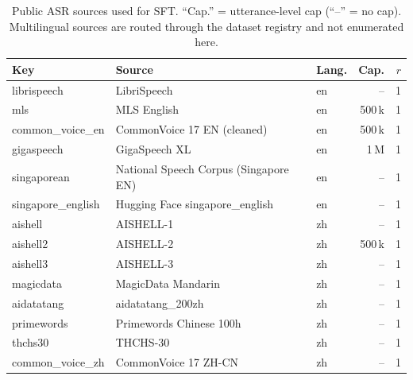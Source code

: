 \begin{table}[t]
  \caption{Public ASR sources used for SFT. ``Cap.'' = utterance-level
    cap (``--'' = no cap). Multilingual sources are routed through the
    dataset registry and not enumerated here.}
  \label{tab:data_asr}
  \centering
  \small
  \setlength{\tabcolsep}{4pt}
  \begin{tabular}{p{2.6cm}p{6.0cm}lrr}
    \toprule
    Key & Source & Lang. & Cap. & $r$ \\
    \midrule
    librispeech         & LibriSpeech \cite{panayotov2015librispeech}                     & en       & --   & 1 \\
    mls                 & MLS English \cite{pratap2020mls}                                & en       & 500\,k & 1 \\
    common\_voice\_en   & CommonVoice 17 EN (cleaned) \cite{ardila2020commonvoice}        & en       & 500\,k & 1 \\
    gigaspeech          & GigaSpeech XL \cite{chen2021gigaspeech}                         & en       & 1\,M & 1 \\
    singaporean         & National Speech Corpus (Singapore EN)                           & en       & --   & 1 \\
    singapore\_english  & Hugging Face singapore\_english                                 & en       & --   & 1 \\
    aishell             & AISHELL-1 \cite{bu2017aishell}                                  & zh       & --   & 1 \\
    aishell2            & AISHELL-2 \cite{du2018aishell2}                                 & zh       & 500\,k & 1 \\
    aishell3            & AISHELL-3 \cite{shi2021aishell3}                                & zh       & --   & 1 \\
    magicdata           & MagicData Mandarin \cite{magicdata}                             & zh       & --   & 1 \\
    aidatatang          & aidatatang\_200zh                                               & zh       & --   & 1 \\
    primewords          & Primewords Chinese 100h                                         & zh       & --   & 1 \\
    thchs30             & THCHS-30 \cite{wang2015thchs30}                                 & zh       & --   & 1 \\
    common\_voice\_zh   & CommonVoice 17 ZH-CN \cite{ardila2020commonvoice}               & zh       & --   & 1 \\

\end{tabular}
\end{table}
